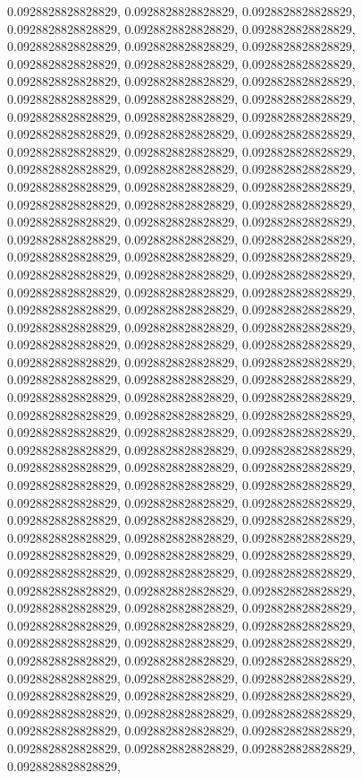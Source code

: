 \documentclass[
  ,man]{apa6}
\begin{document}
0.0928828828828829, 0.0928828828828829, 0.0928828828828829, 0.0928828828828829, 0.0928828828828829, 0.0928828828828829, 0.0928828828828829, 0.0928828828828829, 0.0928828828828829, 0.0928828828828829, 0.0928828828828829, 0.0928828828828829, 0.0928828828828829, 0.0928828828828829, 0.0928828828828829, 0.0928828828828829, 0.0928828828828829, 0.0928828828828829, 0.0928828828828829, 0.0928828828828829, 0.0928828828828829, 0.0928828828828829, 0.0928828828828829, 0.0928828828828829, 0.0928828828828829, 0.0928828828828829,
0.0928828828828829, 0.0928828828828829, 0.0928828828828829, 0.0928828828828829, 0.0928828828828829, 0.0928828828828829, 0.0928828828828829, 0.0928828828828829, 0.0928828828828829, 0.0928828828828829, 0.0928828828828829, 0.0928828828828829, 0.0928828828828829, 0.0928828828828829, 0.0928828828828829, 0.0928828828828829, 0.0928828828828829, 0.0928828828828829, 0.0928828828828829, 0.0928828828828829, 0.0928828828828829, 0.0928828828828829, 0.0928828828828829, 0.0928828828828829, 0.0928828828828829, 0.0928828828828829,
0.0928828828828829, 0.0928828828828829, 0.0928828828828829, 0.0928828828828829, 0.0928828828828829, 0.0928828828828829, 0.0928828828828829, 0.0928828828828829, 0.0928828828828829, 0.0928828828828829, 0.0928828828828829, 0.0928828828828829, 0.0928828828828829, 0.0928828828828829, 0.0928828828828829, 0.0928828828828829, 0.0928828828828829, 0.0928828828828829, 0.0928828828828829, 0.0928828828828829, 0.0928828828828829, 0.0928828828828829, 0.0928828828828829, 0.0928828828828829, 0.0928828828828829, 0.0928828828828829,
0.0928828828828829, 0.0928828828828829, 0.0928828828828829, 0.0928828828828829, 0.0928828828828829, 0.0928828828828829, 0.0928828828828829, 0.0928828828828829, 0.0928828828828829, 0.0928828828828829, 0.0928828828828829, 0.0928828828828829, 0.0928828828828829, 0.0928828828828829, 0.0928828828828829, 0.0928828828828829, 0.0928828828828829, 0.0928828828828829, 0.0928828828828829, 0.0928828828828829, 0.0928828828828829, 0.0928828828828829, 0.0928828828828829, 0.0928828828828829, 0.0928828828828829, 0.0928828828828829,
0.0928828828828829, 0.0928828828828829, 0.0928828828828829, 0.0928828828828829, 0.0928828828828829, 0.0928828828828829, 0.0928828828828829, 0.0928828828828829, 0.0928828828828829, 0.0928828828828829, 0.0928828828828829, 0.0928828828828829, 0.0928828828828829, 0.0928828828828829, 0.0928828828828829, 0.0928828828828829, 0.0928828828828829, 0.0928828828828829, 0.0928828828828829, 0.0928828828828829, 0.0928828828828829, 0.0928828828828829, 0.0928828828828829, 0.0928828828828829, 0.0928828828828829, 0.0928828828828829,
\end{document}
